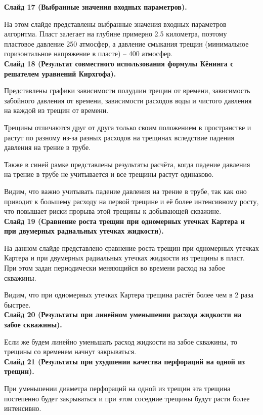 \documentclass[a4paper, 12pt]{article}
\begin{document}
\textbf{Слайд 17 (Выбранные значения входных параметров).}

На этом слайде представлены выбранные значения входных параметров алгоритма.
Пласт залегает на глубине примерно 2.5 километра, поэтому пластовое давление 250 атмосфер, а давление смыкания трещин (минимальное горизонтальное напряжение в пласте) -- 400 атмосфер.
\\


\textbf{Слайд 18 (Результат совместного использования формулы Кёнинга с решателем уравнений Кирхгофа).}

Представлены графики зависимости полудлин трещин от времени, зависимость забойного давления от времени, зависимости расходов воды и чистого давления на каждой из трещин от времени.

Трещины отличаются друг от друга только своим положением в пространстве и растут по разному из-за разных расходов на трещинах вследствие падения давления на трение в трубе.

Также в синей рамке представлены результаты расчёта, когда падение давления на трение в трубе не учитывается и все трещины растут одинаково.

Видим, что важно учитывать падение давления на трение в трубе, так как оно приводит к большему расходу на первой трещине и её более интенсивному росту, что повышает риски прорыва этой трещины к добывающей скважине.
\\


\textbf{Слайд 19 (Сравнение роста трещин при одномерных утечках Картера и при двумерных радиальных утечках жидкости).}

На данном слайде представлено сравнение роста трещин при одномерных утечках Картера и при двумерных радиальных утечках жидкости из трещины в пласт.
При этом задан периодически меняющийся во времени расход на забое скважины.

Видим, что при одномерных утечках Картера трещина растёт более чем в 2 раза быстрее.
\\


\textbf{Слайд 20 (Результаты при линейном уменьшении расхода жидкости на забое скважины).}

Если же будем линейно уменьшать расход жидкости на забое скважины, то трещины со временем начнут закрываться.
\\


\textbf{Слайд 21 (Результаты при ухудшении качества перфораций на одной из трещин).}

При уменьшении диаметра перфораций на одной из трещин эта трещина постепенно будет закрываться и при этом соседние трещины будут расти более интенсивно.
\\
\end{document}
